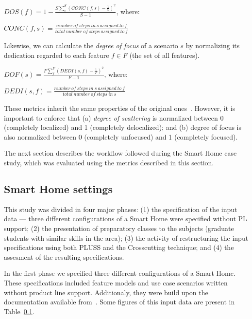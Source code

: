\documentclass{acm_proc_article-sp}
\begin{document}
\begin{center}
$DOS(f) = 1 - \frac{S \sum_{s}^{S}(CONC(f,s)-\frac{1}{S})^2}{S-1}$, where:

$CONC(f,s) = \frac{number\ of\ steps\ in\ s\ assigned\ to\ f}{total\ number\
of\ steps\ assigned\ to\ f}$
\end{center}

Likewise, we can calculate the \emph{degree of focus} of a scenario $s$ by
normalizing its dedication regarded to each feature $f \in F$ (the set of
all features). 

\begin{center}
$DOF(s) = \frac{F \sum_{f}^{F}(DEDI(s,f)-\frac{1}{F})^2}{F-1}$, where:

$DEDI(s,f) = \frac{number\ of\ steps\ in\ s\ assigned\ to\ f}{total\ number\
of\ steps\ in\ s}$
\end{center}

These metrics inherit the same properties of the original
ones~\cite{Eaddy:2007aa}. However, it is important to enforce that (a)
\emph{degree of scattering} is normalized between 0 (completely localized) and 1 (completely
delocalized); and (b) degree of focus is also normalized between 0 (completely
unfocused) and 1 (completely focused). 

The next section describes the workflow followed during the Smart Home
case study, which was evaluated using the metrics described in this section.

\subsection{Smart Home settings}

This study was divided in four major phases: (1) the specification of the input
data --- three different configurations of a Smart Home were specified without
PL support; (2) the presentation of preparatory classes to the subjects
(graduate students with similar skills in the area); (3) the activity of
restructuring the input specifications using both PLUSS and the Crosscutting
technique; and (4) the assesment of the resulting specifications.

In the first phase we specified three different configurations of a Smart
Home. These specifications included feature models and use case
scenarios written without product line support. Additionaly, they were build
upon the documentation available from~\cite{Pohl:2005aa,Mauricio,AMPLE}. Some
figures of this input data are present in Table~\ref{}.
\end{document}

